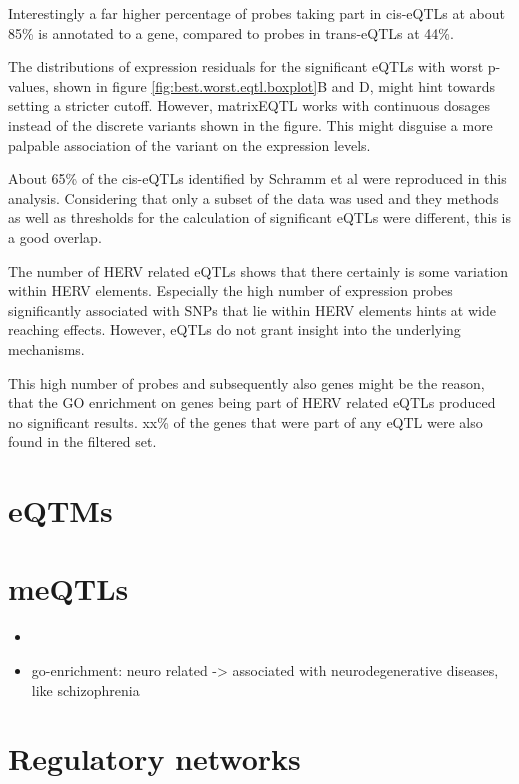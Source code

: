 \documentclass[a4paper,12pt,twoside,openright]{report}
\begin{document}
Interestingly a far higher percentage of probes taking part in cis-eQTLs at about 85\% is annotated to a gene, compared to probes in trans-eQTLs at 44\%. %
 
The distributions of expression residuals for the significant eQTLs with worst p-values, shown in figure \ref{fig:best.worst.eqtl.boxplot}B and D, might hint towards setting a stricter cutoff. However, matrixEQTL works with continuous dosages instead of the discrete variants shown in the figure. This might disguise a more palpable association of the variant on the expression levels.

About 65\% of the cis-eQTLs identified by Schramm et al\cite{Schramm2014} were reproduced in this analysis. Considering that only a subset of the data was used and they methods as well as thresholds for the calculation of significant eQTLs were different, this is a good overlap. 

The number of HERV related eQTLs shows that there certainly is some variation within HERV elements. Especially the high number of expression probes significantly associated with SNPs that lie within HERV elements hints at wide reaching effects. However, eQTLs do not grant insight into the underlying mechanisms. 

This high number of probes and subsequently also genes might be the reason, that the GO enrichment on genes being part of HERV related eQTLs produced no significant results. xx\% of the genes that were part of any eQTL were also found in the filtered set.
\section{eQTMs}
\label{Discussion:eQTMs}


\section{meQTLs}
\label{Discussion:meQTLs}
\begin{itemize}
\item 
\item go-enrichment: neuro related -> associated with neurodegenerative diseases\cite{Mortelmans2016}, like schizophrenia\cite{10.3389/fpsyt.2015.00183}
\end{itemize}

\section{Regulatory networks}
\label{Discussion:Regulatory networks}
\end{document}

